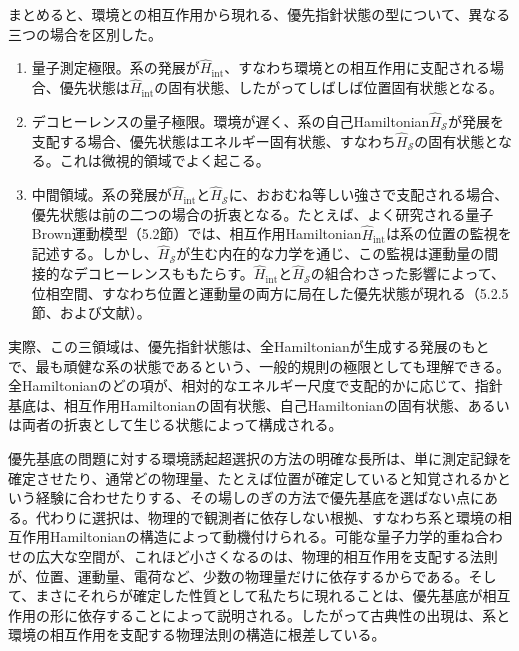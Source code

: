 まとめると、環境との相互作用から現れる、優先指針状態の型について、異なる三つの場合を区別した。
\begin{enumerate}
\item 量子測定極限。系の発展が$\hat H_{\mathrm{int}}$、すなわち環境との相互作用に支配される場合、優先状態は$\hat H_{\mathrm{int}}$の固有状態、したがってしばしば位置固有状態となる。
\item デコヒーレンスの量子極限。環境が遅く、系の自己Hamiltonian$\hat H_{\mathcal S}$が発展を支配する場合、優先状態はエネルギー固有状態、すなわち$\hat H_{\mathcal S}$の固有状態となる\cite{ref103}。これは微視的領域でよく起こる。
\item 中間領域。系の発展が$\hat H_{\mathrm{int}}$と$\hat H_{\mathcal S}$に、おおむね等しい強さで支配される場合、優先状態は前の二つの場合の折衷となる。たとえば、よく研究される量子Brown運動模型（5.2節）では、相互作用Hamiltonian$\hat H_{\mathrm{int}}$は系の位置の監視を記述する。しかし、$\hat H_{\mathcal S}$が生む内在的な力学を通じ、この監視は運動量の間接的なデコヒーレンスももたらす。$\hat H_{\mathrm{int}}$と$\hat H_{\mathcal S}$の組合わさった影響によって、位相空間、すなわち位置と運動量の両方に局在した優先状態が現れる（5.2.5節、および文献\cite{ref016,ref017,ref086,ref106,ref109}）。
\end{enumerate}
実際、この三領域は、優先指針状態は、全Hamiltonianが生成する発展のもとで、最も頑健な系の状態であるという、一般的規則の極限としても理解できる。全Hamiltonianのどの項が、相対的なエネルギー尺度で支配的かに応じて、指針基底は、相互作用Hamiltonianの固有状態、自己Hamiltonianの固有状態、あるいは両者の折衷として生じる状態によって構成される。

\hypertarget{srcpage:85}{}\label{srcpage:85}
優先基底の問題に対する環境誘起超選択の方法の明確な長所は、単に測定記録を確定させたり、通常どの物理量、たとえば位置が確定していると知覚されるかという経験に合わせたりする、その場しのぎの方法で優先基底を選ばない点にある。代わりに選択は、物理的で観測者に依存しない根拠、すなわち系と環境の相互作用Hamiltonianの構造によって動機付けられる。可能な量子力学的重ね合わせの広大な空間が、これほど小さくなるのは、物理的相互作用を支配する法則が、位置、運動量、電荷など、少数の物理量だけに依存するからである。そして、まさにそれらが確定した性質として私たちに現れることは、優先基底が相互作用の形に依存することによって説明される。したがって古典性の出現は、系と環境の相互作用を支配する物理法則の構造に根差している。
